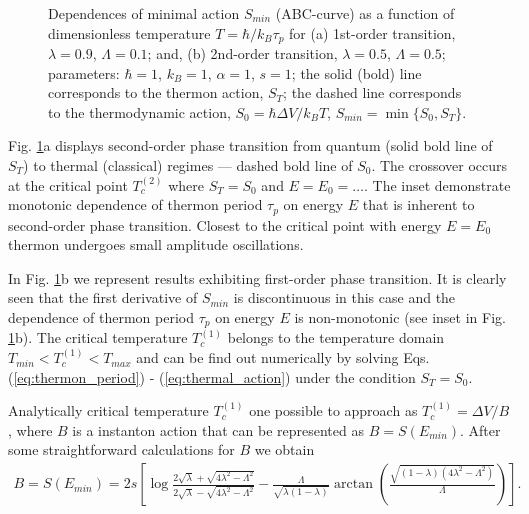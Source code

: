 \documentclass[aps, pre, preprint, groupedaddress, superscriptaddress, showkeys, showpacs] {revtex4-1}
\begin{document}
\begin{figure}[ht]
\begin{minipage}[h]{0.49\linewidth}
\end{minipage}
\caption{Dependences of minimal action $S_{min}$ (ABC-curve) as a function of dimensionless temperature $ T= \hbar / k_B \tau_p$ for (a) 1st-order transition, $\lambda = 0.9$, $\Lambda = 0.1$; and, (b) 2nd-order transition, $\lambda = 0.5$, $\Lambda = 0.5$; parameters: $\hbar = 1$, $k_B = 1$, $\alpha = 1$, $s = 1$; the solid (bold) line corresponds to the thermon action, $S_T$; the dashed line corresponds to the thermodynamic action, $S_0 = \hbar \Delta V / k_B T$, $S_{min} = \min \{S_0, S_T\}$. \label{pic:action_period}}
\end{figure}
%

Fig. \ref{pic:action_period}a displays second-order phase transition from quantum (solid bold line of $S_T$) to thermal (classical) regimes --- dashed bold line of $S_0$.
The crossover occurs at the critical point $T_{c}^{(2)}$ where $S_T = S_0$ and {\red $E = E_0 = \dots$}.
The inset demonstrate monotonic dependence of thermon period $\tau_p$ on energy $E$ that is inherent to second-order phase transition.
Closest to the critical point with energy $E=E_0$ thermon undergoes small amplitude oscillations.  
  
In Fig. \ref{pic:action_period}b we represent results exhibiting first-order phase transition.
It is clearly seen that the first derivative of $S_{min}$ is discontinuous in this case and the dependence of thermon period $\tau_p$ on energy $E$ is non-monotonic (see inset in Fig. \ref{pic:action_period}b).
The critical temperature $T_{c}^{(1)}$ belongs to the temperature domain $T_{min} < T_{c}^{(1)} < T_{max}$ and can be find out numerically by solving Eqs.(\ref{eq:thermon_period}) - (\ref{eq:thermal_action}) under the condition $S_T = S_0$.
 
Analytically critical temperature $T_{c}^{(1)}$ one possible to approach as $T_{c}^{(1)} = \Delta V / B$, where $B$ is a instanton action that can be represented as $B = S(E_{min})$.
After some straightforward calculations for $B$ we obtain
%
\begin{equation}
\begin{array}{c}
B = S(E_{min}) = 2 s \left[ \log \frac{2 \sqrt{\lambda} + \sqrt{4 \lambda^2 - \Lambda^2}}{2 \sqrt{\lambda} - \sqrt{4 \lambda^2 - \Lambda^2}} - \frac{\Lambda}{\sqrt{\lambda (1 - \lambda)}} \arctan \left( \frac{\sqrt{(1 - \lambda) (4 \lambda^2 - \Lambda^2)}}{\Lambda} \right) \right].
\end{array}
\label{eq:B_action}
\end{equation}
%
\end{document}
